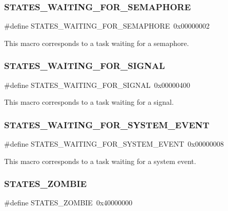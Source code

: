 \subsubsection{\texorpdfstring{STATES\_WAITING\_FOR\_SEMAPHORE}{STATES\_WAITING\_FOR\_SEMAPHORE}}
{\footnotesize\ttfamily \#define S\+T\+A\+T\+E\+S\+\_\+\+W\+A\+I\+T\+I\+N\+G\+\_\+\+F\+O\+R\+\_\+\+S\+E\+M\+A\+P\+H\+O\+RE~0x00000002}

This macro corresponds to a task waiting for a semaphore. \mbox{\label{group__RTEMSScoreStates_ga568c03c478c18dda78ba985e70fbf7a1}} 
\subsubsection{\texorpdfstring{STATES\_WAITING\_FOR\_SIGNAL}{STATES\_WAITING\_FOR\_SIGNAL}}
{\footnotesize\ttfamily \#define S\+T\+A\+T\+E\+S\+\_\+\+W\+A\+I\+T\+I\+N\+G\+\_\+\+F\+O\+R\+\_\+\+S\+I\+G\+N\+AL~0x00000400}

This macro corresponds to a task waiting for a signal. \mbox{\label{group__RTEMSScoreStates_ga4cd356db218ca0f93cea8bed214c5532}} 
\subsubsection{\texorpdfstring{STATES\_WAITING\_FOR\_SYSTEM\_EVENT}{STATES\_WAITING\_FOR\_SYSTEM\_EVENT}}
{\footnotesize\ttfamily \#define S\+T\+A\+T\+E\+S\+\_\+\+W\+A\+I\+T\+I\+N\+G\+\_\+\+F\+O\+R\+\_\+\+S\+Y\+S\+T\+E\+M\+\_\+\+E\+V\+E\+NT~0x00000008}

This macro corresponds to a task waiting for a system event. \mbox{\label{group__RTEMSScoreStates_ga9bf0f53422c075e223e8359f863cbae5}} 
\subsubsection{\texorpdfstring{STATES\_ZOMBIE}{STATES\_ZOMBIE}}
{\footnotesize\ttfamily \#define S\+T\+A\+T\+E\+S\+\_\+\+Z\+O\+M\+B\+IE~0x40000000}

